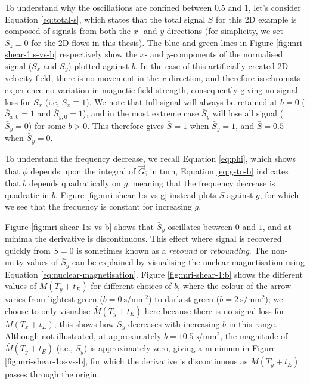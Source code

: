                 To understand why the oscillations are confined between $0.5$ and $1$, let's consider Equation \eqref{eq:total-s}, which states that the total signal $S$ for this 2D example is composed of signals from both the $x$- and $y$-directions (for simplicity, we set $S_z \equiv 0$ for the 2D flows in this thesis). The blue and green lines in Figure \ref{fig:mri-shear-1:s-vs-b} respectively show the $x$- and $y$-components of the normalised signal ($\bar{S}_x$ and $\bar{S}_y$) plotted against $b$. In the case of this artificially-created 2D velocity field, there is no movement in the $x$-direction, and therefore isochromats experience no variation in magnetic field strength, consequently giving no signal loss for $S_x$ (i.e, $S_x \equiv 1$). We note that full signal will always be retained at $b=0$ ($\bar{S}_{x,0} = 1$ and $\bar{S}_{y,0} = 1$), and in the most extreme case $\bar{S}_y$ will lose all signal ($\bar{S}_y = 0$) for some $b > 0$. This therefore gives $\bar{S} = 1$ when $\bar{S}_y = 1$, and $\bar{S} = 0.5$ when $\bar{S}_y = 0$.
                
                To understand the frequency decrease, we recall Equation \eqref{eq:phi}, which shows that $\phi$ depends upon the integral of $\vec{G}$; in turn, Equation \eqref{eq:g-to-b} indicates that $b$ depends quadratically on $g$, meaning that the frequency decrease is quadratic in $b$. Figure \ref{fig:mri-shear-1:s-vs-g} instead plots $S$ against $g$, for which we see that the frequency is constant for increasing $g$.
                
                Figure \ref{fig:mri-shear-1:s-vs-b} shows that $\bar{S}_y$ oscillates between $0$ and $1$, and at minima the derivative is discontinuous. This effect where signal is recovered quickly from $S=0$ is sometimes known as a \textit{rebound} or \textit{rebounding}. The non-unity values of $\bar{S}_y$ can be explained by visualising the nuclear magnetisation using Equation \eqref{eq:nuclear-magnetisation}. Figure \ref{fig:mri-shear-1:b} shows the different values of $\bar{M}(T_y + t_E)$ for different choices of $b$, where the colour of the arrow varies from lightest green ($b=\qty{0}{\second\per\milli\metre^2}$) to darkest green ($b=\qty{2}{\second\per\milli\metre^2}$); we choose to only visualise $\bar{M}(T_y + t_E)$ here because there is no signal loss for $\bar{M}(T_x + t_E)$; this shows how $S_y$ decreases with increasing $b$ in this range. Although not illustrated, at approximately $b=\qty{10.5}{\second\per\milli\metre^2}$, the magnitude of $\bar{M}(T_y + t_E)$ (i.e., $S_y$) is approximately zero, giving a minimum in Figure \ref{fig:mri-shear-1:s-vs-b}, for which the derivative is discontinuous as $\bar{M}(T_y + t_E)$ passes through the origin.
                
